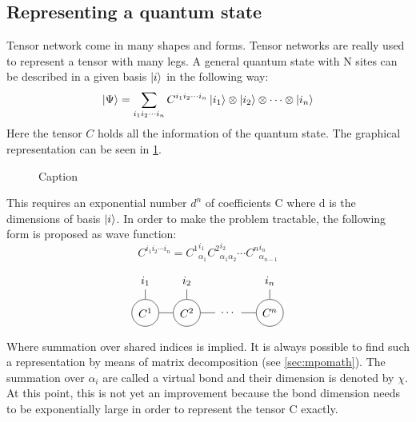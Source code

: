 \subsection{Representing a quantum state}

Tensor network come in many shapes and forms. Tensor networks are really used to represent a tensor with many legs. A general quantum state with N sites can be described in a given basis $\ket{i}$ in the following way:
\begin{equation}
    \ket{\Psi} = \sum_{i_1 i_2 \cdots i_n } C^{i_1 i_2 \cdots i_n} \ket{i_1} \otimes \ket{i_2} \otimes \cdots \otimes \ket{i_n}
\end{equation}
Here the tensor $C$ holds all the information of the quantum state. The graphical representation can be seen in \cref{fig:tens:intro:C}.
\begin{figure}
    \centering


    \caption{Caption}
    \label{fig:tens:intro:C}
\end{figure}

This requires an exponential number $d^n$ of coefficients C where d is the dimensions of basis $\ket{i}$. In order to make the problem tractable, the following form is proposed as wave function:
\begin{equation}
    C^{i_1 i_2 \cdots i_n} = {C^{1}}_{\alpha_1}^{ i_1} {C^{2}}_{\alpha_1 \alpha_2}^{i_2} \cdots  {C^{n}}_{\alpha_{n-1} }^{i_n}
\end{equation}

\begin{equation}
    \mpo{4}{{"-",,,,,}}{{"$i_1$","$i_2$",,"$i_n$","-"}}{{"-","-",,"-","-"}}{{0,0,1,0,0}}{{"$C^1$", "$C^2$",,"$C^n$", }}
\end{equation}

Where summation over shared indices is implied. It is always possible to find such a representation by means of matrix decomposition (see \cref{sec:mpomath}). The summation over $\alpha_i$ are called a virtual bond and their dimension is denoted by $\chi$. At this point, this is not yet an improvement because the bond dimension needs to be exponentially large in order to represent the tensor C exactly.

